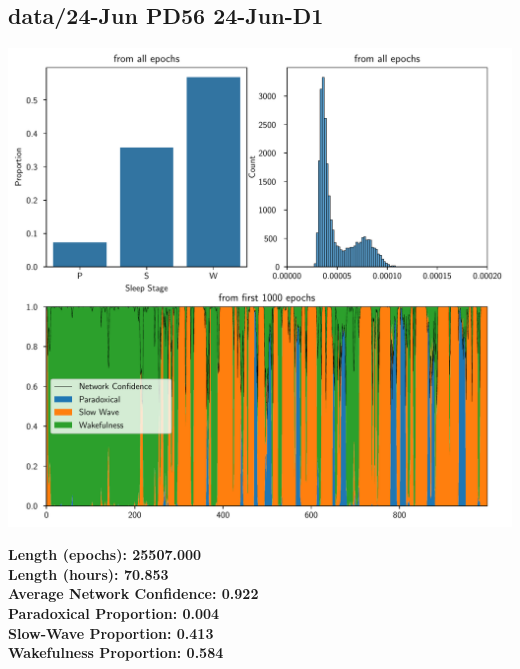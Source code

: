         \subsection*{ data/24-Jun PD56 24-Jun-D1 }
        \begin{center}
        \begin{adjustbox}{width=1\textwidth}
        \includegraphics[page=14]{figs.pdf}
        \end{adjustbox}
        \end{center}
        \large\textbf{Length (epochs): 25507.000}\\
        \textbf{Length (hours): 70.853}\\
        \textbf{Average Network Confidence: 0.922}\\
        \textbf{Paradoxical Proportion: 0.004}\\
        \textbf{Slow-Wave Proportion: 0.413}\\
        \textbf{Wakefulness Proportion: 0.584}\\
        
